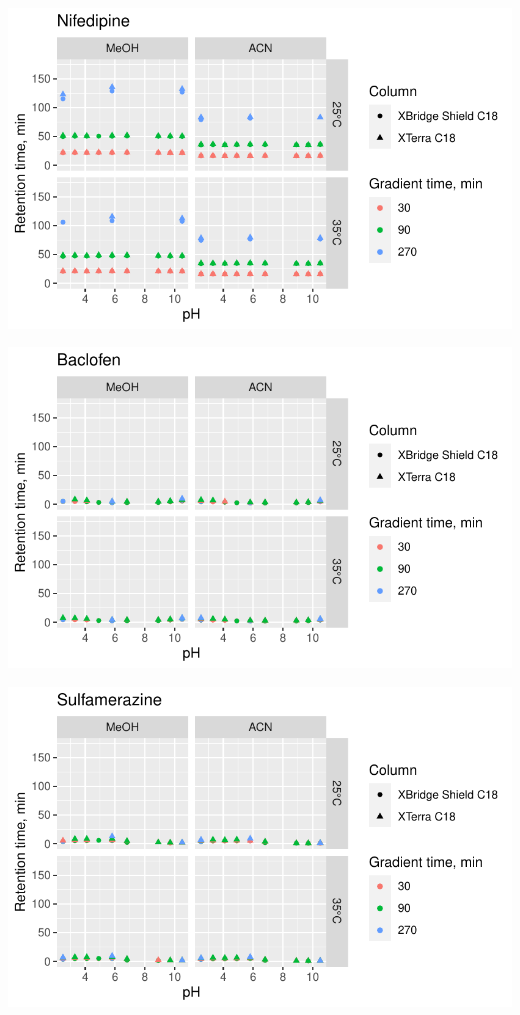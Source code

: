 \documentclass[
  letterpaper,
  DIV=11,
  numbers=noendperiod]{scrreprt}
\begin{document}
\includegraphics{index_files/figure-pdf/unnamed-chunk-4-3.pdf}

\includegraphics{index_files/figure-pdf/unnamed-chunk-4-4.pdf}

\includegraphics{index_files/figure-pdf/unnamed-chunk-4-5.pdf}
\end{document}
